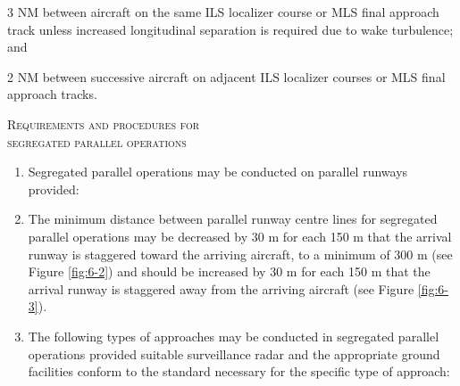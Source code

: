 \documentclass[../main.tex]{subfiles}
\begin{document}
\begin{enumeratesc}
\begin{enumerate}
            \begin{enumalph}
                \item 3 NM between aircraft on the same ILS localizer course or MLS final approach track unless increased longitudinal separation is required due to wake turbulence; and
                \item 2 NM between successive aircraft on adjacent ILS localizer courses or MLS final approach tracks.
            \end{enumalph}
        \end{enumerate}

        \item \textsc{Requirements and procedures for \\ segregated parallel operations}
        \begin{enumerate}
            \item \label{6.7.3.5.1} Segregated parallel operations may be conducted on parallel runways provided:


            \item \label{6.7.3.5.2} The minimum distance between parallel runway centre lines for segregated parallel operations may be decreased by 30 m for each 150 m that the arrival runway is staggered toward the arriving aircraft, to a minimum of 300 m (see Figure \ref{fig:6-2}) and should be increased by 30 m for each 150 m that the arrival runway is staggered away from the arriving aircraft (see Figure \ref{fig:6-3}).


            
            
            \item The following types of approaches may be conducted in segregated parallel operations provided suitable surveillance radar and the appropriate ground facilities conform to the standard necessary for the specific type of approach:


\end{enumerate}
\end{enumeratesc}
\end{document}
